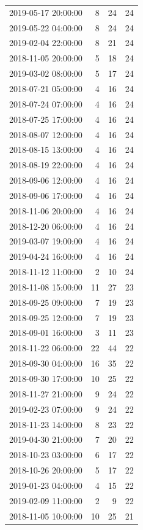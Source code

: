 \begin{tabular}{lrrr}
2019-05-17 20:00:00 & 8 & 24 & 24 \\
2019-05-22 04:00:00 & 8 & 24 & 24 \\
2019-02-04 22:00:00 & 8 & 21 & 24 \\
2018-11-05 20:00:00 & 5 & 18 & 24 \\
2019-03-02 08:00:00 & 5 & 17 & 24 \\
2018-07-21 05:00:00 & 4 & 16 & 24 \\
2018-07-24 07:00:00 & 4 & 16 & 24 \\
2018-07-25 17:00:00 & 4 & 16 & 24 \\
2018-08-07 12:00:00 & 4 & 16 & 24 \\
2018-08-15 13:00:00 & 4 & 16 & 24 \\
2018-08-19 22:00:00 & 4 & 16 & 24 \\
2018-09-06 12:00:00 & 4 & 16 & 24 \\
2018-09-06 17:00:00 & 4 & 16 & 24 \\
2018-11-06 20:00:00 & 4 & 16 & 24 \\
2018-12-20 06:00:00 & 4 & 16 & 24 \\
2019-03-07 19:00:00 & 4 & 16 & 24 \\
2019-04-24 16:00:00 & 4 & 16 & 24 \\
2018-11-12 11:00:00 & 2 & 10 & 24 \\
2018-11-08 15:00:00 & 11 & 27 & 23 \\
2018-09-25 09:00:00 & 7 & 19 & 23 \\
2018-09-25 12:00:00 & 7 & 19 & 23 \\
2018-09-01 16:00:00 & 3 & 11 & 23 \\
2018-11-22 06:00:00 & 22 & 44 & 22 \\
2018-09-30 04:00:00 & 16 & 35 & 22 \\
2018-09-30 17:00:00 & 10 & 25 & 22 \\
2018-11-27 21:00:00 & 9 & 24 & 22 \\
2019-02-23 07:00:00 & 9 & 24 & 22 \\
2018-11-23 14:00:00 & 8 & 23 & 22 \\
2019-04-30 21:00:00 & 7 & 20 & 22 \\
2018-10-23 03:00:00 & 6 & 17 & 22 \\
2018-10-26 20:00:00 & 5 & 17 & 22 \\
2019-01-23 04:00:00 & 4 & 15 & 22 \\
2019-02-09 11:00:00 & 2 & 9 & 22 \\
2018-11-05 10:00:00 & 10 & 25 & 21 \\

\end{tabular}
